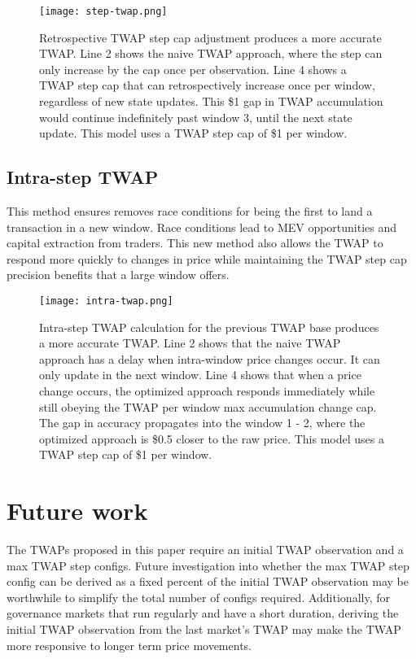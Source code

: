 \documentclass{article}
\begin{document}
\begin{figure}[H]
    \centering
    \texttt{[image: step-twap.png]}
    \caption{Retrospective TWAP step cap adjustment produces a more accurate TWAP. Line 2 shows the naive TWAP approach, where the step can only increase by the cap once per observation. Line 4 shows a TWAP step cap that can retrospectively increase once per window, regardless of new state updates. This \$1 gap in TWAP accumulation would continue indefinitely past window 3, until the next state update. This model uses a TWAP step cap of \$1 per window.}
    \label{fig:enter-label}
\end{figure}

\subsection{Intra-step TWAP}
This method ensures removes race conditions for being the first to land a transaction in a new window. Race conditions lead to MEV opportunities and capital extraction from traders. This new method also allows the TWAP to respond more quickly to changes in price while maintaining the TWAP step cap precision benefits that a large window offers.

\begin{figure}[H]
    \centering
    \texttt{[image: intra-twap.png]}
    \caption{Intra-step TWAP calculation for the previous TWAP base produces a more accurate TWAP. Line 2 shows that the naive TWAP approach has a delay when intra-window price changes occur. It can only update in the next window. Line 4 shows that when a price change occurs, the optimized approach responds immediately while still obeying the TWAP per window max accumulation change cap. The gap in accuracy propagates into the window 1 - 2, where the optimized approach is \$0.5 closer to the raw price. This model uses a TWAP step cap of \$1 per window.}
    \label{fig:enter-label}
\end{figure}

\section{Future work}
The TWAPs proposed in this paper require an initial TWAP observation and a max TWAP step configs. Future investigation into whether the max TWAP step config can be derived as a fixed percent of the initial TWAP observation may be worthwhile to simplify the total number of configs required. Additionally, for governance markets that run  regularly and have a short duration, deriving the initial TWAP observation from the last market's TWAP may make the TWAP more responsive to longer term price movements.

\nocite{*}                %
\end{document}
